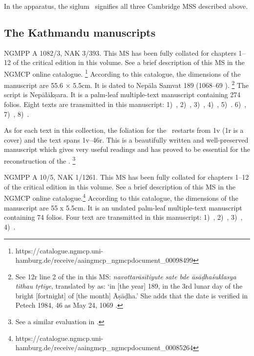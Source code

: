 In the apparatus, the siglum \mssCaCbCc\ signifies all three Cambridge 
MSS described above.

\medskip
\subsection{The Kathmandu manuscripts}
NGMPP A 1082/3, NAK 3/393. This MS has been fully 
collated for chapters 1--12 of the critical edition in this volume. 
See a brief description of this MS in
the NGMCP online catalogue.%
	\footnote{https://catalogue.ngmcp.uni-hamburg.de/receive/aaingmcp\_ngmcpdocument\_00098499}
According to this catalogue, the dimensions of the 
manuscript are 55.6 × 5.5cm. 
It is dated to Nepāla Samvat 189 (1068--69 \CE).%
	\footnote{See \fol12r line 2 of the 
	 in this MS: 
	\emph{navottarāsītiyute sate bde āsāḍhaśuklasya
  tithau tṛtīye}, translated by  as: 
  `in {[}the year{]} 189, in the 3rd lunar day of the bright {[}fortnight{]}
  of {[}the month{]} Āṣāḍha.' She adds that the date is verified in
  Petech 1984, 46 as May 24, 1069 \CE.} The script is Nepālākṣara. It is
a palm-leaf multiple-text manuscript containing 274 folios. Eight texts
are transmitted in this manuscript: 
1)~,
2)~, 
3)~, 
4)~, 
5)~.
6)~,
7)~,
8)~\Uums.

As for each text in this collection, the foliation for the
\VSS\ restarts from \fol1v (\fol1r is a cover) and the text
spans \fols1v--46r. This is a beautifully written and well-preserved
manuscript which gives very useful readings and has proved to be
essential for the reconstruction of the \Vss.%
	\footnote{See a similar evaluation in
					.}


NGMPP A 10/5, NAK 1/1261. This MS has been fully collated 
for chapters 1--12 of the critical edition in this volume. 
See a brief description of this MS in
the NGMCP online catalogue.\footnote{https://catalogue.ngmcp.uni-hamburg.de/receive/aaingmcp\_ngmcpdocument\_00085264}
According to this catalogue, the dimensions of the manuscript are 55 x
5.5cm. It is an undated palm-leaf multiple-text manuscript containing 74
folios. Four text are transmitted in this manuscript: 
1)~,
2)~,
3)~, 
4)~.

